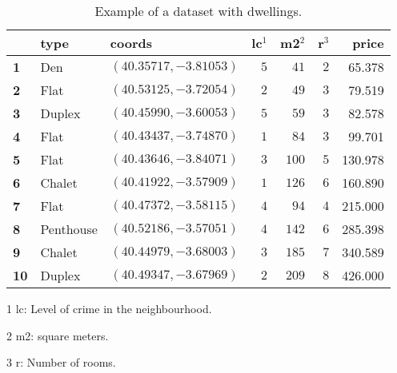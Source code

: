 \begin{table}[H]
  \centering
  \begin{threeparttable}[t]
       \begin{tabular}{l|llrrrr}
        \toprule
        {} &   \textbf{type} & \textbf{coords} & \textbf{lc$^1$} & \textbf{m2$^2$} &  \textbf{r$^3$} & \textbf{price} \\
        \midrule
        \textbf{1} &       Den &  $(40.35717, -3.81053)$ &   $5$ &   $41$ & $2$ &  65.378 \\
        \textbf{2} &   Flat &  $(40.53125, -3.72054)$ &   $2$ &   $49$ &  $3$ & 79.519 \\
        \textbf{3} &        Duplex & $(40.45990, -3.60053)$  &   $5$ &   $59$ &  $3$ & 82.578 \\
        \textbf{4} &   Flat &  $(40.43437, -3.74870)$ &   $1$ &   $84$ &  $3$ & 99.701 \\
        \textbf{5} &   Flat &  $(40.43646, -3.84071)$ &   $3$ &  $100$ & $5$ & 130.978 \\
        \textbf{6} &         Chalet &  $(40.41922, -3.57909)$ &   $1$ &  $126$ & $6$ & 160.890 \\
        \textbf{7} &   Flat &  $(40.47372, -3.58115)$ &   $4$ &   $94$ & $4$ & 215.000 \\
        \textbf{8} &         Penthouse &  $(40.52186, -3.57051)$ &   $4$ &  $142$ & $6$ & 285.398 \\
        \textbf{9} &         Chalet &  $(40.44979, -3.68003)$ &   $3$ &  $185$ & $7$ & 340.589 \\
        \textbf{10} &       Duplex & $(40.49347, -3.67969)$ & $2$ &  $209$ & $8$ & 426.000 \\
        \bottomrule
         \end{tabular}
     \begin{tablenotes}
     \item[1] lc: Level of crime in the neighbourhood.
     \item[2] m2: square meters.
     \item[3] r: Number of rooms.
   \end{tablenotes}
    \end{threeparttable}%
\caption{Example of a dataset with dwellings.}
  \label{tab:houses}
\end{table}%




